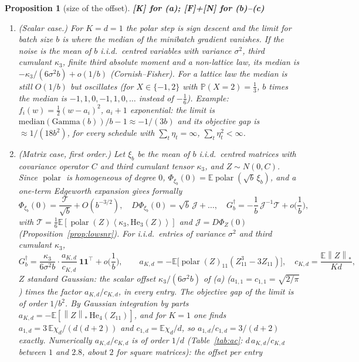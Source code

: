 \documentclass[11pt]{article}
\newtheorem{proposition}[theorem]{Proposition}
\theoremstyle{definition}
\theoremstyle{remark}
\newcommand{\E}{\mathbb{E}}
\newcommand{\Prob}{\mathbb{P}}
\newcommand{\nnuc}[1]{\left\|#1\right\|_{*}}
\newcommand{\inner}[2]{\left\langle #1, #2 \right\rangle}
\newcommand{\polar}{\operatorname{polar}}
\newcommand{\ones}{\mathbf{1}}
\begin{document}
\begin{proposition}[size of the offset]\label{prop:offset} \textbf{[K] for (a); [F]+[N] for (b)--(c)}
\begin{enumerate}[label=(\alph*)]
\item (Scalar case.) For $K=d=1$ the polar step is sign descent and the limit for batch size $b$ is where the median of
the minibatch gradient vanishes. If the noise is the mean of $b$ i.i.d.\ centred variables with variance $\sigma^2$,
third cumulant $\kappa_3$, finite third absolute moment and a \emph{non-lattice} law, its median is
$-\kappa_3/(6\sigma^2b)+o(1/b)$ (Cornish--Fisher). For a lattice law the median is still $O(1/b)$ but oscillates (for
$X\in\{-1,2\}$ with $\Prob(X=2)=\frac13$, $b$ times the median is $-1,1,0,-1,1,0,\dots$ instead of $-\frac16$). Example:
$f_i(w)=\frac12(w-a_i)^2$, $a_i+1$ exponential: the limit is $\mathrm{median}(\mathrm{Gamma}(b))/b-1\approx-1/(3b)$ and
its objective gap is $\approx1/(18b^2)$, for every schedule with $\sum_t\eta_t=\infty$, $\sum_t\eta_t^2<\infty$.
\item (Matrix case, first order.) Let $\xi_b$ be the mean of $b$ i.i.d.\ centred matrices with covariance operator $C$
and third cumulant tensor $\kappa_3$, and $Z\sim N(0,C)$. Since $\polar$ is homogeneous of degree $0$,
$\Phi_{\xi_b}(0)=\E\polar(\sqrt b\,\xi_b)$, and a one-term Edgeworth expansion gives formally
\[
\Phi_{\xi_b}(0)=\frac{\mathcal T}{\sqrt b}+O(b^{-3/2}),\quad D\Phi_{\xi_b}(0)=\sqrt b\,\mathcal J+\dots,\quad
G_b^\dagger=-\frac1b\,\mathcal J^{-1}\mathcal T+o\Big(\frac1b\Big),
\]
with $\mathcal T=\frac16\E[\polar(Z)\inner{\kappa_3}{\mathrm{He}_3(Z)}]$ and $\mathcal J=D\Phi_Z(0)$ (Proposition~\ref{prop:lowsnr}).
For i.i.d.\ entries of variance $\sigma^2$ and third cumulant $\kappa_3$,
\begin{equation}\label{eq:offset}
G_b^\dagger=\frac{\kappa_3}{6\sigma^2b}\cdot\frac{a_{K,d}}{c_{K,d}}\ \ones\ones^\top+o\Big(\frac1b\Big),\qquad
a_{K,d}=-\E\big[\polar(Z)_{11}(Z_{11}^3-3Z_{11})\big],\quad c_{K,d}=\frac{\E\nnuc Z}{Kd},
\end{equation}
$Z$ standard Gaussian: the scalar offset $\kappa_3/(6\sigma^2b)$ of (a) ($a_{1,1}=c_{1,1}=\sqrt{2/\pi}$) times the factor
$a_{K,d}/c_{K,d}$, in every entry. The objective gap of the limit is of order $1/b^2$. By Gaussian integration by parts
$a_{K,d}=-\E[\nnuc Z\,\mathrm{He}_4(Z_{11})]$, and for $K=1$ one finds $a_{1,d}=3\,\E\chi_d/(d(d+2))$ and
$c_{1,d}=\E\chi_d/d$, so $a_{1,d}/c_{1,d}=3/(d+2)$ exactly. Numerically $a_{K,d}/c_{K,d}$ is of order $1/d$
(Table~\ref{tab:ac}: $d\,a_{K,d}/c_{K,d}$ between $1$ and $2.8$, about $2$ for square matrices): the offset per entry

\end{enumerate}
\end{proposition}
\end{document}
